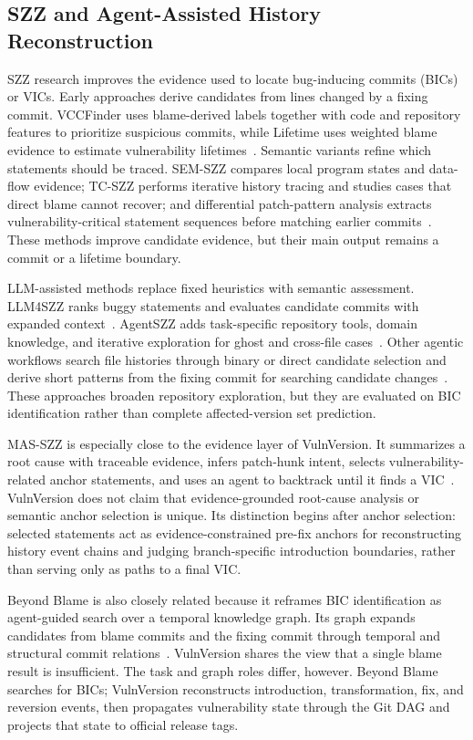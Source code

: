 \subsection{SZZ and Agent-Assisted History Reconstruction}

SZZ research improves the evidence used to locate bug-inducing commits (BICs) or VICs. Early approaches derive candidates from lines changed by a fixing commit. VCCFinder uses blame-derived labels together with code and repository features to prioritize suspicious commits, while Lifetime uses weighted blame evidence to estimate vulnerability lifetimes~\cite{vccfinder2015,lifetime2021}. Semantic variants refine which statements should be traced. SEM-SZZ compares local program states and data-flow evidence; TC-SZZ performs iterative history tracing and studies cases that direct blame cannot recover; and differential patch-pattern analysis extracts vulnerability-critical statement sequences before matching earlier commits~\cite{semszz2024,tcszz2024,vicpatterns2026}. These methods improve candidate evidence, but their main output remains a commit or a lifetime boundary.

LLM-assisted methods replace fixed heuristics with semantic assessment. LLM4SZZ ranks buggy statements and evaluates candidate commits with expanded context~\cite{llm4szz2025}. AgentSZZ adds task-specific repository tools, domain knowledge, and iterative exploration for ghost and cross-file cases~\cite{agentszz2026}. Other agentic workflows search file histories through binary or direct candidate selection and derive short patterns from the fixing commit for searching candidate changes~\cite{howwhyagents2026}. These approaches broaden repository exploration, but they are evaluated on BIC identification rather than complete affected-version set prediction.

MAS-SZZ is especially close to the evidence layer of VulnVersion. It summarizes a root cause with traceable evidence, infers patch-hunk intent, selects vulnerability-related anchor statements, and uses an agent to backtrack until it finds a VIC~\cite{masszz2026}. VulnVersion does not claim that evidence-grounded root-cause analysis or semantic anchor selection is unique. Its distinction begins after anchor selection: selected statements act as evidence-constrained pre-fix anchors for reconstructing history event chains and judging branch-specific introduction boundaries, rather than serving only as paths to a final VIC.

Beyond Blame is also closely related because it reframes BIC identification as agent-guided search over a temporal knowledge graph. Its graph expands candidates from blame commits and the fixing commit through temporal and structural commit relations~\cite{beyondblame2026}. VulnVersion shares the view that a single blame result is insufficient. The task and graph roles differ, however. Beyond Blame searches for BICs; VulnVersion reconstructs introduction, transformation, fix, and reversion events, then propagates vulnerability state through the Git DAG and projects that state to official release tags.

